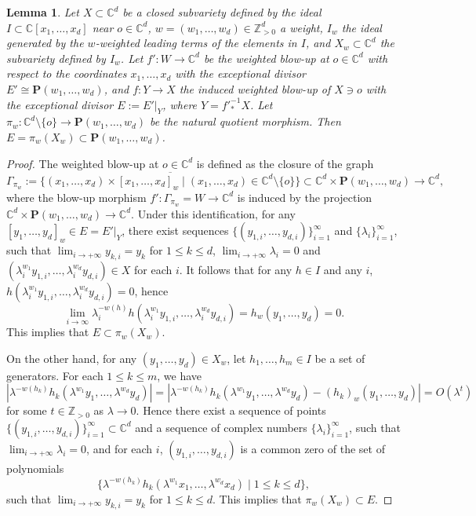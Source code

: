 \documentclass[11pt]{amsart}
\numberwithin{equation}{section}
\newcommand{\Cc}{\mathbb{C}}
\newcommand{\Zz}{\mathbb{Z}}
\newcommand{\Ii}{{\Gamma}}
\newtheorem{lem}[thm]{Lemma}
\theoremstyle{definition}
\theoremstyle{definition}
\begin{document}
\begin{lem}\label{lem: exceptional locus of weighted blow-ups}
Let $X\subset \Cc^d$ be a closed subvariety defined by the ideal $I\subset \Cc[x_1,\dots,x_d]$ near $o\in \Cc^d$, $w=(w_1,\dots,w_d)\in \Zz_{>0}^d$ a weight, $I_w$ the ideal generated by the $w$-weighted leading terms of the elements in $I$, and $X_w\subset \Cc^d$ the subvariety defined by $I_w$. Let $f': W\to \Cc^d$ be the weighted blow-up at $o\in\Cc^d$ with respect to the coordinates $x_1,\dots,x_d$ with the exceptional divisor $E'\cong \mathbf{P}(w_1,\dots,w_d)$, and $f: Y\to X$ the induced weighted blow-up of $X\ni o$ with the exceptional divisor $E:=E'|_Y$, where $Y={f'}_*^{-1} X$. Let $\pi_w: \Cc^d\setminus \{o\}\to \mathbf{P}(w_1,\dots,w_d)$ be the natural quotient morphism. Then $E=\pi_w(X_w)\subset \mathbf{P}(w_1,\dots,w_d)$.
\end{lem}


\begin{proof}
The weighted blow-up at $o\in \Cc^d$ is defined as the closure of the graph $$\Ii_{\pi_w}:=\overline{\{(x_1,\dots,x_d)\times[x_1,\dots,x_d]_w\mid (x_1,\dots,x_d)\in \Cc^d\setminus\{o\}\}}\subset \Cc^d\times \mathbf{P}(w_1,\dots,w_d)\to \Cc^d,$$ where the blow-up morphism $f': \Ii_{\pi_w}=W\to \Cc^d$ is induced by the projection $\Cc^d\times \mathbf{P}(w_1,\dots,w_d)\to \Cc^d$. Under this identification, for any $[y_1,\dots,y_d]_w\in E=E'|_Y$, there exist sequences $\{(y_{1,i},\dots,y_{d,i})\}_{i=1}^{\infty}$ and  $\{\lambda_i\}_{i=1}^\infty$, such that $\lim_{i\to +\infty}y_{k,i}=y_k$ for $1\leq k\leq d$, $\lim_{i\to +\infty} \lambda_i=0$ and $(\lambda_i^{w_1}y_{1,i},\dots,\lambda_i^{w_d}y_{d,i})\in X$ for each $i$. It follows that for any $h\in I$ and any $i$, $h(\lambda_i^{w_1}y_{1,i},\dots,\lambda_i^{w_d}y_{d,i})=0$, hence $$\lim_{i\to \infty} \lambda_i^{-w(h)}h(\lambda_i^{w_1}y_{1,i},\dots,\lambda_i^{w_d}y_{d,i})=h_w(y_1,\dots,y_d)=0.$$ This implies that $E\subset \pi_w(X_w)$.


On the other hand, for any $(y_1,\dots,y_d)\in X_w$, let $h_1,\dots,h_m\in I$ be a set of generators. For each $1\leq k\leq m$, we have $$|\lambda^{-w(h_k)}h_k(\lambda^{w_1}y_1,\dots,\lambda^{w_d}y_d)|=|\lambda^{-w(h_k)}h_k(\lambda^{w_1}y_1,\dots,\lambda^{w_d}y_d)-(h_k)_w(y_1,\dots,y_d)|=O(\lambda^t)$$ for some $t\in \Zz_{>0}$ as $\lambda\to 0$. Hence there exist a sequence of points $\{(y_{1,i},\dots,y_{d,i})\}_{i=1}^{\infty}\subset \Cc^d$ and a sequence of complex numbers $\{\lambda_i\}_{i=1}^\infty$, such that $\lim_{i\to +\infty} \lambda_i= 0$, and for each $i$, $(y_{1,i},\dots,y_{d,i})$ is a common zero of the set of polynomials $$\{\lambda^{-w(h_k)}h_k(\lambda^{w_1}x_1,\dots,\lambda^{w_d}x_d)\mid 1\leq k\leq d\},$$ such that $\lim_{i\to +\infty}y_{k,i}=y_k$ for $1\leq k\leq d$. This implies that $\pi_w(X_w)\subset E$.
\end{proof}
\end{document}
